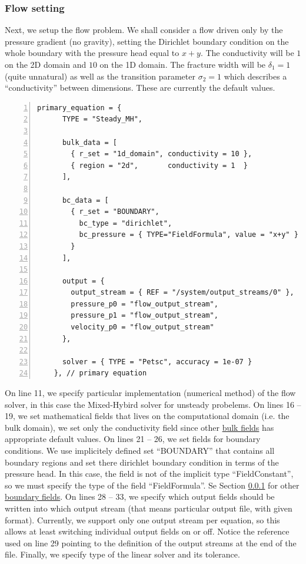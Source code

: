 \documentclass[12pt,a4paper]{report}
\begin{document}
\subsubsection{Flow setting}
Next, we setup the flow problem. We shall consider a flow driven only by the pressure gradient (no gravity),
setting the Dirichlet boundary condition on the whole boundary with the pressure head equal to $x+y$. 
The conductivity will be $1$ on the 2D domain and $10$ on the 1D domain.
The fracture width will be $\delta_1=1$ (quite unnatural) as well as the transition parameter 
$\sigma_2 = 1$ which describes a ``conductivity'' between dimensions. 
These are currently the default values.

\begin{Verbatim}[numbers=left, firstnumber=last]
    primary_equation = {
      TYPE = "Steady_MH", 

      bulk_data = [
        { r_set = "1d_domain", conductivity = 10 },
        { region = "2d",       conductivity = 1  }
      ],
      
      bc_data = [
        { r_set = "BOUNDARY",
          bc_type = "dirichlet",
          bc_pressure = { TYPE="FieldFormula", value = "x+y" }
        }
      ],

      output = {
        output_stream = { REF = "/system/output_streams/0" }, 
        pressure_p0 = "flow_output_stream", 
        pressure_p1 = "flow_output_stream", 
        velocity_p0 = "flow_output_stream"
      }, 
      
      solver = { TYPE = "Petsc", accuracy = 1e-07 }
    }, // primary equation
\end{Verbatim}
On line 11, we specify particular implementation (numerical method) of the flow solver, in this case the Mixed-Hybird
solver for unsteady probelems. On lines 16 -- 19, we set mathematical fields that lives on the computational domain 
(i.e. the bulk domain), we set only the conductivity field since other \hyperlink{IT::DarcyFlowMH-Steady-BulkData}{bulk fields} has appropriate default values.
On lines 21 -- 26, we set fields for boundary conditions. We use implicitely defined set ``BOUNDARY'' that contains all boundary regions and set there dirichlet boundary condition in terms of the 
pressure head. In this case, the field is not of the implicit type ``FieldConstant'', so we must specify the type of the field ``FieldFormula''. Se Section \ref{} for other 
\hyperlink{IT::DarcyFlowMH-Steady-BulkData}{boundary fields}. On lines 28 -- 33, we specify which output fields should be written into which output stream (that means particular output file, with given format).
Currently, we support only one output stream per equation, so this allows at least switching individual output fields on or off. 
Notice the reference used on line 29 pointing to the definition of the output streams at the end of the file. Finally, we specify type of the linear solver and its tolerance.
\end{document}
